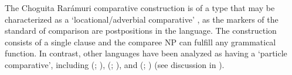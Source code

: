 The Choguita Rarámuri comparative construction is of a type that may be characterized as a `locational/adverbial comparative' \citet{stassen1984comparative}, as the markers of the standard of comparison are postpositions in the language. The construction consists of a single clause and the comparee NP can fulfill any grammatical function. In contrast, other  languages have been analyzed as having a `particle comparative', including  (; \citealt{smalley1953phonemic}),  (; \citealt{zepeda1983tohono}), and  (; \citealt{dayley1989tumpisa}) (see discussion in \citealt{wals-121}).
